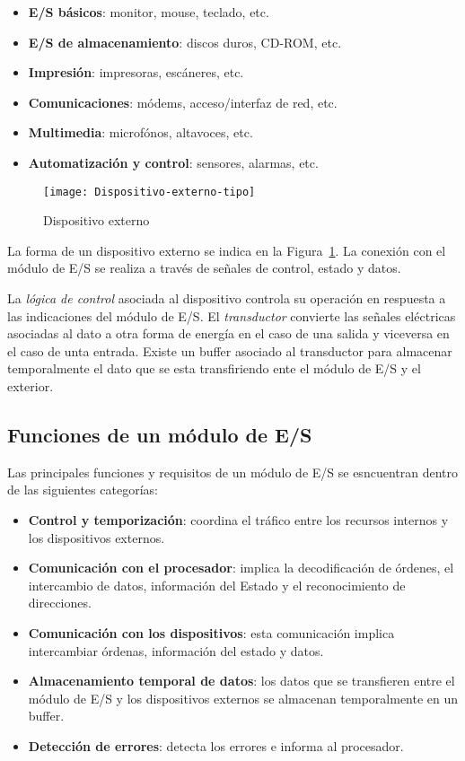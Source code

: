 \begin{itemize}
  \item \textbf{E/S básicos}: monitor, mouse, teclado, etc.
  \item \textbf{E/S de almacenamiento}: discos duros, CD-ROM, etc.
  \item \textbf{Impresión}: impresoras, escáneres, etc.
  \item \textbf{Comunicaciones}: módems, acceso/interfaz de red, etc.
  \item \textbf{Multimedia}: microfónos, altavoces, etc.
  \item \textbf{Automatización y control}: sensores, alarmas, etc.
\end{itemize}

\begin{figure}[H]
  \centering
  \texttt{[image: Dispositivo-externo-tipo]}
  \caption{Dispositivo externo}\label{fig:Dispositivo-externo-tipo}
\end{figure}

La forma de un dispositivo externo se indica en la Figura~\ref{fig:Dispositivo-externo-tipo}. La conexión con el módulo de E/S se realiza a través de señales de control, estado y datos. 

La \textit{lógica de control} asociada al dispositivo controla su operación en respuesta a las indicaciones del módulo de E/S. El \textit{transductor} convierte las señales eléctricas asociadas al dato a otra forma de energía en el caso de una salida y viceversa en el caso de unta entrada. Existe un buffer asociado al transductor para almacenar temporalmente el dato que se esta transfiriendo ente el módulo de E/S y el exterior.

\subsection{Funciones de un módulo de E/S}

Las principales funciones y requisitos de un módulo de E/S se esncuentran dentro de las siguientes categorías:

\begin{itemize}
  \item \textbf{Control y temporización}: coordina el tráfico entre los recursos internos y los dispositivos externos.
  \item \textbf{Comunicación con el procesador}: implica la decodificación de órdenes, el intercambio de datos, información del Estado y el reconocimiento de direcciones.
  \item \textbf{Comunicación con los dispositivos}: esta comunicación implica intercambiar órdenas, información del estado y datos.
  \item \textbf{Almacenamiento temporal de datos}: los datos que se transfieren entre el módulo de E/S y los dispositivos externos se almacenan temporalmente en un buffer.
  \item \textbf{Detección de errores}: detecta los errores e informa al procesador.
\end{itemize}

